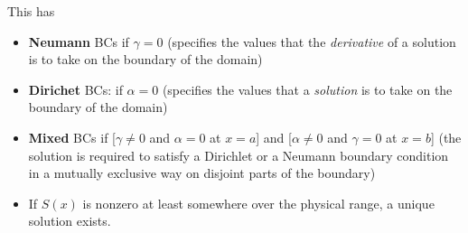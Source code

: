 \documentclass[12pt]{article}
\newcommand{\ve}[1]{\ensuremath{\mathbf{#1}}}
\begin{document}
This has

\begin{itemize}
\item \textbf{Neumann} BCs if $\gamma = 0$ (specifies the values that the
       \textit{derivative} of a solution is to take on the boundary of the
       domain)
\item \textbf{Dirichet} BCs: if $\alpha=0$ (specifies the values that a
      \textit{solution} is to take on the boundary of the domain)
\item \textbf{Mixed} BCs if [$\gamma \ne 0$ and $\alpha = 0$ at $x = a$] and
      [$\alpha \ne 0$ and $\gamma = 0$ at $x = b$] (the solution is required
      to satisfy a Dirichlet or a Neumann boundary condition in a mutually
      exclusive way on disjoint parts of the boundary)
\item If $S(x)$ is nonzero at least somewhere over the physical range, a
      unique solution exists.
\end{itemize}

%
\end{document}
